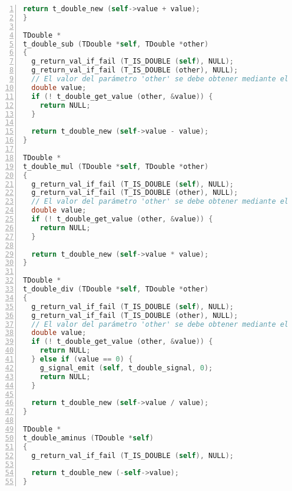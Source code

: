 \begin{lstlisting}[language=C, numbers=left]
  return t_double_new (self->value + value);
}

TDouble *
t_double_sub (TDouble *self, TDouble *other)
{
  g_return_val_if_fail (T_IS_DOUBLE (self), NULL);
  g_return_val_if_fail (T_IS_DOUBLE (other), NULL);
  // El valor del parámetro 'other' se debe obtener mediante el método 'getter'
  double value;
  if (! t_double_get_value (other, &value)) {
    return NULL;
  }

  return t_double_new (self->value - value);
}

TDouble *
t_double_mul (TDouble *self, TDouble *other)
{
  g_return_val_if_fail (T_IS_DOUBLE (self), NULL);
  g_return_val_if_fail (T_IS_DOUBLE (other), NULL);
  // El valor del parámetro 'other' se debe obtener mediante el método 'getter'
  double value;
  if (! t_double_get_value (other, &value)) {
    return NULL;
  }

  return t_double_new (self->value * value);
}

TDouble *
t_double_div (TDouble *self, TDouble *other)
{
  g_return_val_if_fail (T_IS_DOUBLE (self), NULL);
  g_return_val_if_fail (T_IS_DOUBLE (other), NULL);
  // El valor del parámetro 'other' se debe obtener mediante el método 'getter'
  double value;
  if (! t_double_get_value (other, &value)) {
    return NULL;
  } else if (value == 0) {
    g_signal_emit (self, t_double_signal, 0);
    return NULL;
  }
    
  return t_double_new (self->value / value);
}

TDouble *
t_double_aminus (TDouble *self)
{
  g_return_val_if_fail (T_IS_DOUBLE (self), NULL);

  return t_double_new (-self->value);
}
\end{lstlisting}

